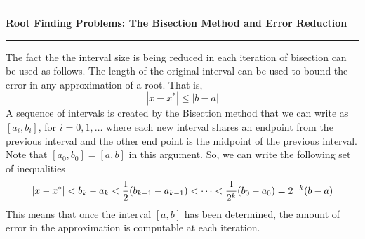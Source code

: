 \documentclass[10pt,fleqn]{article}
\begin{document}
\vskip0.1in\hrule\vskip0.1in
\noindent
{\bf Root Finding Problems: The Bisection Method and Error Reduction}
\vskip0.1in\hrule\vskip0.1in
\noindent
The fact the the interval size is being reduced in each iteration of bisection
can be used as follows. The length of the original interval can be used to
bound the error in any approximation of a root. That is,
$$
  | x - x^* | \leq | b - a |
$$
A sequence of intervals is created by the Bisection method that we can write as
$[a_i, b_i]$, for $i=0,1,\ldots$ where each new interval shares an endpoint from
the previous interval and the other end point is the midpoint of the previous
interval. Note that $[a_0, b_0]=[a,b]$ in this argument. So, we can write the
following set of inequalities
$$
  | x - x^* | < b_k - a_k < {1\over 2} ( b_{k-1} - a_{k-1} ) < \cdots
                    < {1\over{2^k}} ( b_0 - a_0 ) = 2^{-k} ( b - a )  
$$ 
This means that once the interval $[a, b]$ has been determined, the amount of
error in the approximation is computable at each iteration.
\end{document}
